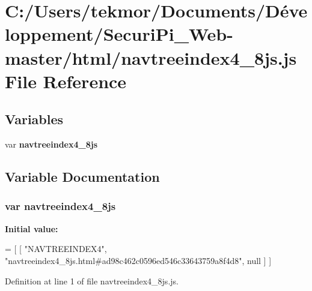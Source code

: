 \section{C\+:/\+Users/tekmor/\+Documents/\+Développement/\+Securi\+Pi\+\_\+\+Web-\/master/html/navtreeindex4\+\_\+8js.js File Reference}
\label{navtreeindex4__8js_8js}
\subsection*{Variables}
\begin{DoxyCompactItemize}
\item 
var {\bf navtreeindex4\+\_\+8js}
\end{DoxyCompactItemize}


\subsection{Variable Documentation}
\subsubsection[{navtreeindex4\+\_\+8js}]{\setlength{\rightskip}{0pt plus 5cm}var navtreeindex4\+\_\+8js}\label{navtreeindex4__8js_8js_adbd140d07d57dcb2100e3d56009baf47}
{\bfseries Initial value\+:}
\begin{DoxyCode}
=
[
    [ \textcolor{stringliteral}{"NAVTREEINDEX4"}, \textcolor{stringliteral}{"navtreeindex4\_8js.html#ad98c462c0596ed546c33643759a8f4d8"}, null ]
]
\end{DoxyCode}


Definition at line 1 of file navtreeindex4\+\_\+8js.\+js.

